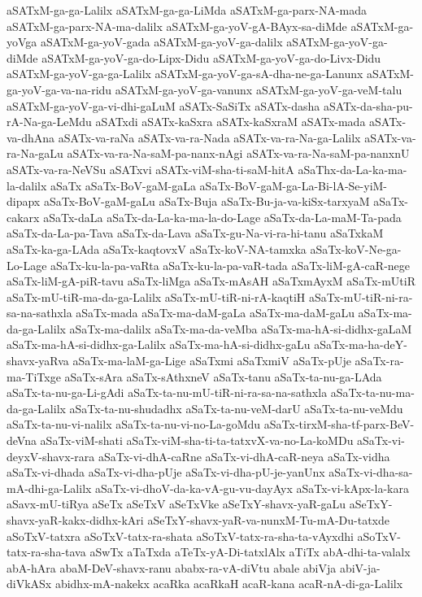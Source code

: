 {aSATxM-ga-ga-Lalilx
aSATxM-ga-ga-LiMda
aSATxM-ga-parx-NA-mada
aSATxM-ga-parx-NA-ma-dalilx
aSATxM-ga-yoV-gA-BAyx-sa-diMde
aSATxM-ga-yoVga
aSATxM-ga-yoV-gada
aSATxM-ga-yoV-ga-dalilx
aSATxM-ga-yoV-ga-diMde
aSATxM-ga-yoV-ga-do-Lipx-Didu
aSATxM-ga-yoV-ga-do-Livx-Didu
aSATxM-ga-yoV-ga-ga-Lalilx
aSATxM-ga-yoV-ga-sA-dha-ne-ga-Lanunx
aSATxM-ga-yoV-ga-va-na-ridu
aSATxM-ga-yoV-ga-vanunx
aSATxM-ga-yoV-ga-veM-talu
aSATxM-ga-yoV-ga-vi-dhi-gaLuM
aSATx-SaSiTx
aSATx-dasha
aSATx-da-sha-pu-rA-Na-ga-LeMdu
aSATxdi
aSATx-kaSxra
aSATx-kaSxraM
aSATx-mada
aSATx-va-dhAna
aSATx-va-raNa
aSATx-va-ra-Nada
aSATx-va-ra-Na-ga-Lalilx
aSATx-va-ra-Na-gaLu
aSATx-va-ra-Na-saM-pa-nanx-nAgi
aSATx-va-ra-Na-saM-pa-nanxnU
aSATx-va-ra-NeVSu
aSATxvi
aSATx-viM-sha-ti-saM-hitA
aSaThx-da-La-ka-ma-la-dalilx
aSaTx
aSaTx-BoV-gaM-gaLa
aSaTx-BoV-gaM-ga-La-Bi-lA-Se-yiM-dipapx
aSaTx-BoV-gaM-gaLu
aSaTx-Buja
aSaTx-Bu-ja-va-kiSx-tarxyaM
aSaTx-cakarx
aSaTx-daLa
aSaTx-da-La-ka-ma-la-do-Lage
aSaTx-da-La-maM-Ta-pada
aSaTx-da-La-pa-Tava
aSaTx-da-Lava
aSaTx-gu-Na-vi-ra-hi-tanu
aSaTxkaM
aSaTx-ka-ga-LAda
aSaTx-kaqtovxV
aSaTx-koV-NA-tamxka
aSaTx-koV-Ne-ga-Lo-Lage
aSaTx-ku-la-pa-vaRta
aSaTx-ku-la-pa-vaR-tada
aSaTx-liM-gA-caR-nege
aSaTx-liM-gA-piR-tavu
aSaTx-liMga
aSaTx-mAsAH
aSaTxmAyxM
aSaTx-mUtiR
aSaTx-mU-tiR-ma-da-ga-Lalilx
aSaTx-mU-tiR-ni-rA-kaqtiH
aSaTx-mU-tiR-ni-ra-sa-na-sathxla
aSaTx-mada
aSaTx-ma-daM-gaLa
aSaTx-ma-daM-gaLu
aSaTx-ma-da-ga-Lalilx
aSaTx-ma-dalilx
aSaTx-ma-da-veMba
aSaTx-ma-hA-si-didhx-gaLaM
aSaTx-ma-hA-si-didhx-ga-Lalilx
aSaTx-ma-hA-si-didhx-gaLu
aSaTx-ma-ha-deY-shavx-yaRva
aSaTx-ma-laM-ga-Lige
aSaTxmi
aSaTxmiV
aSaTx-pUje
aSaTx-ra-ma-TiTxge
aSaTx-sAra
aSaTx-sAthxneV
aSaTx-tanu
aSaTx-ta-nu-ga-LAda
aSaTx-ta-nu-ga-Li-gAdi
aSaTx-ta-nu-mU-tiR-ni-ra-sa-na-sathxla
aSaTx-ta-nu-ma-da-ga-Lalilx
aSaTx-ta-nu-shudadhx
aSaTx-ta-nu-veM-darU
aSaTx-ta-nu-veMdu
aSaTx-ta-nu-vi-nalilx
aSaTx-ta-nu-vi-no-La-goMdu
aSaTx-tirxM-sha-tf-parx-BeV-deVna
aSaTx-viM-shati
aSaTx-viM-sha-ti-ta-tatxvX-va-no-La-koMDu
aSaTx-vi-deyxV-shavx-rara
aSaTx-vi-dhA-caRne
aSaTx-vi-dhA-caR-neya
aSaTx-vidha
aSaTx-vi-dhada
aSaTx-vi-dha-pUje
aSaTx-vi-dha-pU-je-yanUnx
aSaTx-vi-dha-sa-mA-dhi-ga-Lalilx
aSaTx-vi-dhoV-da-ka-vA-gu-vu-dayAyx
aSaTx-vi-kApx-la-kara
aSavx-mU-tiRya
aSeTx
aSeTxV
aSeTxVke
aSeTxY-shavx-yaR-gaLu
aSeTxY-shavx-yaR-kakx-didhx-kAri
aSeTxY-shavx-yaR-va-nunxM-Tu-mA-Du-tatxde
aSoTxV-tatxra
aSoTxV-tatx-ra-shata
aSoTxV-tatx-ra-sha-ta-vAyxdhi
aSoTxV-tatx-ra-sha-tava
aSwTx
aTaTxda
aTeTx-yA-Di-tatxlAlx
aTiTx
abA-dhi-ta-valalx
abA-hAra
abaM-DeV-shavx-ranu
ababx-ra-vA-diVtu
abale
abiVja
abiV-ja-diVkASx
abidhx-mA-nakekx
acaRka
acaRkaH
acaR-kana
acaR-nA-di-ga-Lalilx
}
